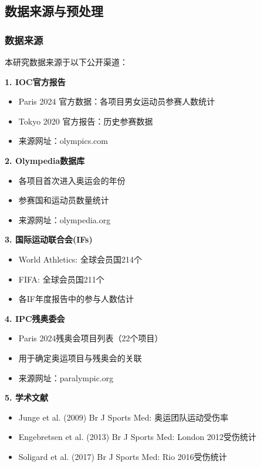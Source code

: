 
\subsection{数据来源与预处理}

\subsubsection{数据来源}

本研究数据来源于以下公开渠道：

\textbf{1. IOC官方报告}
\begin{itemize}
\item Paris 2024 官方数据：各项目男女运动员参赛人数统计
\item Tokyo 2020 官方报告：历史参赛数据
\item 来源网址：olympics.com
\end{itemize}

\textbf{2. Olympedia数据库}
\begin{itemize}
\item 各项目首次进入奥运会的年份
\item 参赛国和运动员数量统计
\item 来源网址：olympedia.org
\end{itemize}

\textbf{3. 国际运动联合会(IFs)}
\begin{itemize}
\item World Athletics: 全球会员国214个
\item FIFA: 全球会员国211个
\item 各IF年度报告中的参与人数估计
\end{itemize}

\textbf{4. IPC残奥委会}
\begin{itemize}
\item Paris 2024残奥会项目列表（22个项目）
\item 用于确定奥运项目与残奥会的关联
\item 来源网址：paralympic.org
\end{itemize}

\textbf{5. 学术文献}
\begin{itemize}
\item Junge et al. (2009) Br J Sports Med: 奥运团队运动受伤率
\item Engebretsen et al. (2013) Br J Sports Med: London 2012受伤统计
\item Soligard et al. (2017) Br J Sports Med: Rio 2016受伤统计
\end{itemize}

